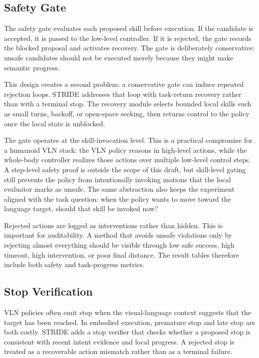 \documentclass[letterpaper,10pt,conference]{ieeeconf}
\begin{document}
\subsection{Safety Gate}
The safety gate evaluates each proposed skill before execution. If the candidate is accepted, it is passed to the low-level controller. If it is rejected, the gate records the blocked proposal and activates recovery. The gate is deliberately conservative: unsafe candidates should not be executed merely because they might make semantic progress.

This design creates a second problem: a conservative gate can induce repeated rejection loops. STRIDE addresses that loop with task-return recovery rather than with a terminal stop. The recovery module selects bounded local skills such as small turns, backoff, or open-space seeking, then returns control to the policy once the local state is unblocked.

The gate operates at the skill-invocation level. This is a practical compromise for a humanoid VLN stack: the VLN policy reasons in high-level actions, while the whole-body controller realizes those actions over multiple low-level control steps. A step-level safety proof is outside the scope of this draft, but skill-level gating still prevents the policy from intentionally invoking motions that the local evaluator marks as unsafe. The same abstraction also keeps the experiment aligned with the task question: when the policy wants to move toward the language target, should that skill be invoked now?

Rejected actions are logged as interventions rather than hidden. This is important for auditability. A method that avoids unsafe violations only by rejecting almost everything should be visible through low safe success, high timeout, high intervention, or poor final distance. The result tables therefore include both safety and task-progress metrics.

\subsection{Stop Verification}
VLN policies often emit stop when the visual-language context suggests that the target has been reached. In embodied execution, premature stop and late stop are both costly. STRIDE adds a stop verifier that checks whether a proposed stop is consistent with recent intent evidence and local progress. A rejected stop is treated as a recoverable action mismatch rather than as a terminal failure.
\end{document}
